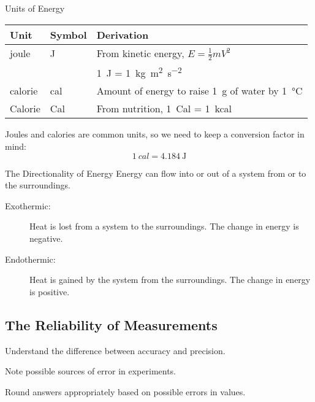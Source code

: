 \documentclass[10pt,letterpaper,twoside]{article}
\begin{document}
\begin{frame}{Units of Energy}
	\begin{center}
		\begin{tabularx}{\linewidth} {l l X}
		\toprule
		\bfseries Unit & \bfseries Symbol & \bfseries Derivation \\
		\midrule
		joule & J & From kinetic energy, $E = \frac{1}{2}mV^2$ \\
		& & \SI{1}{\joule} =
		\SI{1}{\kilo\gram\meter\squared\per\second\squared} \\
		calorie & cal & Amount of energy to raise \SI{1}{\gram} of water
		by \SI{1}{\celsius} \\
		Calorie & Cal & From nutrition, \SI{1}{Cal} =
		\SI{1}{\kilo cal} \\
		\bottomrule
	\end{tabularx}
	\end{center}

	Joules and calories are common units, so we need to keep a
	\alert{conversion factor} in mind:
	\begin{equation*}
		\SI{1}{cal} = \SI{4.184}{\joule}
	\end{equation*}
\end{frame}

\begin{frame}{The Directionality of Energy}
	Energy can flow into or out of a \alert{system} from or to the
	\alert{surroundings}.

	\begin{description}
		\item[Exothermic:] Heat is lost from a system to the
			surroundings. The change in energy is \alert{negative}.
		\item[Endothermic:] Heat is gained by the system from the
			surroundings. The change in energy is
				\alert{positive}.
	\end{description}
\end{frame}

\begin{frame}{}
	\section{The Reliability of Measurements}
	\begin{learningobjectives}
		\item Understand the difference between accuracy and precision.
		\item Note possible sources of error in experiments.
		\item Round answers appropriately based on possible errors in
			values.
	\end{learningobjectives}
\end{frame}
\end{document}
